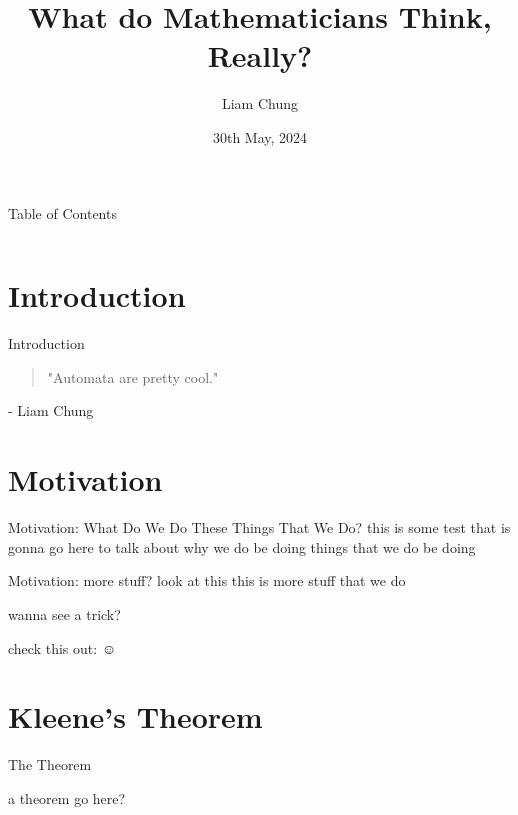 \documentclass{beamer}
\title{What do Mathematicians Think, Really?}
\author{Liam Chung}
\date{30th May, 2024}
\begin{document}
\frame{\titlepage}

\begin{frame}{Table of Contents}
\begin{columns}[t]
    \begin{column}{.5\textwidth}
        \tableofcontents[sections={1-4}, hideallsubsections]
    \end{column}
    \begin{column}{.5\textwidth}
        \tableofcontents[sections={5-8}, hideallsubsections]
    \end{column}
\end{columns}
\end{frame}

\section{Introduction}
    \begin{frame}{Introduction}
        \begin{quote}
            "Automata are pretty cool."
        \end{quote}
        - Liam Chung
    \end{frame}

\section{Motivation}
    \begin{frame}{Motivation: What Do We Do These Things That We Do?}
      this is some test that is gonna go here to talk about why we do be doing things that we do be doing
    \end{frame}
    \begin{frame}{Motivation: more stuff?}
      look at this this is more stuff that we do

      wanna see a trick?

      check this out: \pause $\smiley$
    \end{frame}

\section{Kleene's Theorem}
    \begin{frame}{The Theorem}
      \begin{theorem}
        a theorem go here?
      \end{theorem}
    \end{frame}
\end{document}
